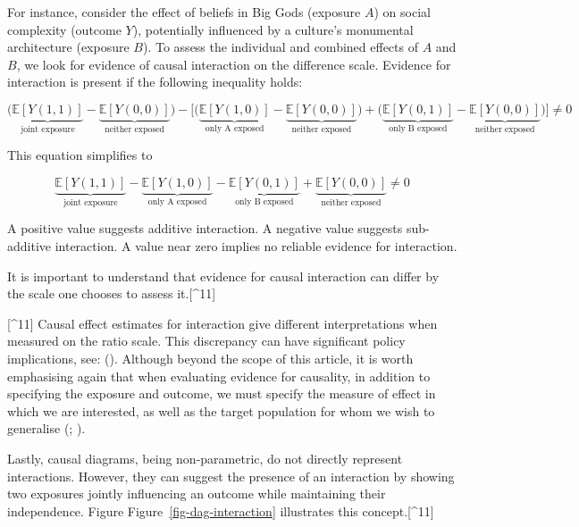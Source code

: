 \documentclass[
  singlecolumn,
  9pt]{article}
\begin{document}
For instance, consider the effect of beliefs in Big Gods (exposure
\(A\)) on social complexity (outcome \(Y\)), potentially influenced by a
culture's monumental architecture (exposure \(B\)). To assess the
individual and combined effects of \(A\) and \(B\), we look for evidence
of causal interaction on the difference scale. Evidence for interaction
is present if the following inequality holds:

\[\bigg(\underbrace{\mathbb{E}[Y(1,1)]}_{\text{joint exposure}} - \underbrace{\mathbb{E}[Y(0,0)]}_{\text{neither exposed}}\bigg) - \bigg[ \bigg(\underbrace{\mathbb{E}[Y(1,0)]}_{\text{only A exposed}} - \underbrace{\mathbb{E}[Y(0,0)]}_{\text{neither exposed}}\bigg) + \bigg(\underbrace{\mathbb{E}[Y(0,1)]}_{\text{only B exposed}} - \underbrace{\mathbb{E}[Y(0,0)]}_{\text{neither exposed}} \bigg)\bigg] \neq 0 \]

This equation simplifies to

\[ \underbrace{\mathbb{E}[Y(1,1)]}_{\text{joint exposure}} - \underbrace{\mathbb{E}[Y(1,0)]}_{\text{only A exposed}} - \underbrace{\mathbb{E}[Y(0,1)]}_{\text{only B exposed}} + \underbrace{\mathbb{E}[Y(0,0)]}_{\text{neither exposed}} \neq 0 \]

A positive value suggests additive interaction. A negative value
suggests sub-additive interaction. A value near zero implies no reliable
evidence for interaction.

It is important to understand that evidence for causal interaction can
differ by the scale one chooses to assess it.{[}\^{}11{]}

{[}\^{}11{]} Causal effect estimates for interaction give different
interpretations when measured on the ratio scale. This discrepancy can
have significant policy implications, see:
(). Although
beyond the scope of this article, it is worth emphasising again that
when evaluating evidence for causality, in addition to specifying the
exposure and outcome, we must specify the measure of effect in which we
are interested, as well as the target population for whom we wish to
generalise (;
).

Lastly, causal diagrams, being non-parametric, do not directly represent
interactions. However, they can suggest the presence of an interaction
by showing two exposures jointly influencing an outcome while
maintaining their independence. Figure Figure~\ref{fig-dag-interaction}
illustrates this concept.{[}\^{}11{]}
\end{document}
